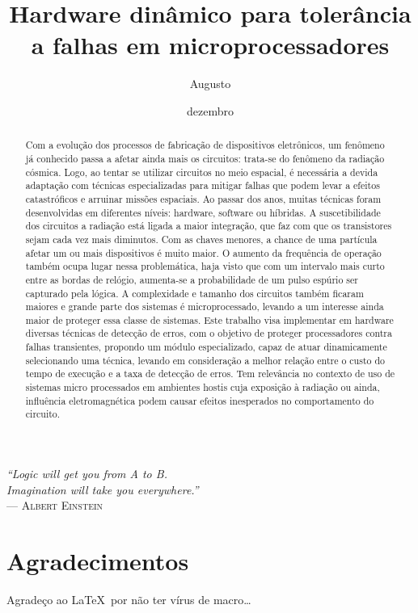 \documentclass[pgmicro,diss,openright,oneside]{iiufrgs}
\title{Hardware dinâmico para tolerância a falhas em microprocessadores}
\author{Augusto}{Thiago Rider}
\date{dezembro}{2015}
\begin{document}
\maketitle

\clearpage
\begin{flushright}
\mbox{}\vfill
{\sffamily\itshape
``Logic will get you from A to B. \\
Imagination will take you everywhere.''\\}
--- \textsc{Albert Einstein}
\end{flushright}

\chapter*{Agradecimentos}
Agradeço ao \LaTeX\ por não ter vírus de macro\ldots



\begin{abstract}
Com a evolução dos processos de fabricação de dispositivos eletrônicos, um fenômeno já conhecido passa a afetar ainda mais os circuitos: trata-se do fenômeno da radiação cósmica. Logo, ao tentar se utilizar circuitos no meio espacial, é necessária a devida adaptação com técnicas especializadas para mitigar falhas que podem levar a efeitos catastróficos e arruinar missões espaciais. Ao passar dos anos, muitas técnicas foram desenvolvidas em diferentes níveis: hardware, software ou híbridas. A suscetibilidade dos circuitos a radiação está ligada a maior integração, que faz com que os transistores sejam cada vez mais diminutos. Com as chaves menores, a chance de uma partícula afetar um ou mais dispositivos é muito maior. O aumento da frequência de operação também ocupa lugar nessa problemática, haja visto que com um intervalo mais curto entre as bordas de relógio, aumenta-se a probabilidade de um pulso espúrio ser capturado pela lógica. A complexidade e tamanho dos circuitos também ficaram maiores e grande parte dos sistemas é microprocessado, levando a um interesse ainda maior de proteger essa classe de sistemas. Este trabalho visa implementar em hardware diversas técnicas de detecção de erros, com o objetivo de proteger processadores contra falhas transientes, propondo um  módulo especializado, capaz de atuar dinamicamente selecionando uma técnica, levando em consideração a melhor relação entre o custo do tempo de execução e a taxa de detecção de erros. Tem relevância no contexto de uso de sistemas micro processados em ambientes hostis cuja exposição à radiação ou ainda, influência eletromagnética podem causar efeitos inesperados no comportamento do circuito.
\end{abstract}
\end{document}
